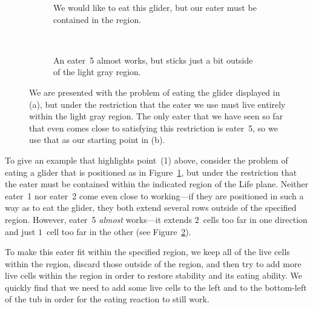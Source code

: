 \begin{figure}[!htb]
	\centering
	\begin{subfigure}{.47\textwidth}
		\centering
		\caption{We would like to eat this glider, but our eater must be contained in the  region.}
		\label{fig:eater_constrained_pre}
	\end{subfigure} \quad \ %
	\begin{subfigure}{.47\textwidth}
		\centering
		\caption{An eater~5 almost works, but sticks just a bit outside of the light gray region.}
		\label{fig:eater_constrained_eater_5}
	\end{subfigure}
	\caption{We are presented with the problem of eating the glider displayed in (a), but under the restriction that the eater we use must live entirely within the light gray region. The only eater that we have seen so far that even comes close to satisfying this restriction is eater~5, so we use that as our starting point in (b).}\label{fig:eater_constrained_eater_5_first}
\end{figure}

To give an example that highlights point~(1) above, consider the problem of eating a glider that is positioned as in Figure~\ref{fig:eater_constrained_pre}, but under the restriction that the eater must be contained within the indicated region of the Life plane. Neither eater~1 nor eater~2 come even close to working---if they are positioned in such a way as to eat the glider, they both extend several rows outside of the specified region. However, eater~5 \emph{almost} works---it extends $2$~cells too far in one direction and just $1$~cell too far in the other (see Figure~\ref{fig:eater_constrained_eater_5}).

To make this eater fit within the specified region, we keep all of the live cells within the region, discard those outside of the region, and then try to add more live cells within the region in order to restore stability and its eating ability. We quickly find that we need to add some live cells to the left and to the bottom-left of the tub in order for the eating reaction to still work.

